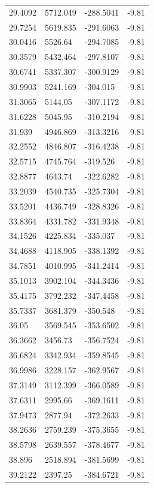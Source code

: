 \begin{table}[H]
\begin{tabular}{llll}
29.4092 & 5712.049 & -288.5041 & -9.81 \\
29.7254 & 5619.835 & -291.6063 & -9.81 \\
30.0416 & 5526.64 & -294.7085 & -9.81 \\
30.3579 & 5432.464 & -297.8107 & -9.81 \\
30.6741 & 5337.307 & -300.9129 & -9.81 \\
30.9903 & 5241.169 & -304.015 & -9.81 \\
31.3065 & 5144.05 & -307.1172 & -9.81 \\
31.6228 & 5045.95 & -310.2194 & -9.81 \\
31.939 & 4946.869 & -313.3216 & -9.81 \\
32.2552 & 4846.807 & -316.4238 & -9.81 \\
32.5715 & 4745.764 & -319.526 & -9.81 \\
32.8877 & 4643.74 & -322.6282 & -9.81 \\
33.2039 & 4540.735 & -325.7304 & -9.81 \\
33.5201 & 4436.749 & -328.8326 & -9.81 \\
33.8364 & 4331.782 & -331.9348 & -9.81 \\
34.1526 & 4225.834 & -335.037 & -9.81 \\
34.4688 & 4118.905 & -338.1392 & -9.81 \\
34.7851 & 4010.995 & -341.2414 & -9.81 \\
35.1013 & 3902.104 & -344.3436 & -9.81 \\
35.4175 & 3792.232 & -347.4458 & -9.81 \\
35.7337 & 3681.379 & -350.548 & -9.81 \\
36.05 & 3569.545 & -353.6502 & -9.81 \\
36.3662 & 3456.73 & -356.7524 & -9.81 \\
36.6824 & 3342.934 & -359.8545 & -9.81 \\
36.9986 & 3228.157 & -362.9567 & -9.81 \\
37.3149 & 3112.399 & -366.0589 & -9.81 \\
37.6311 & 2995.66 & -369.1611 & -9.81 \\
37.9473 & 2877.94 & -372.2633 & -9.81 \\
38.2636 & 2759.239 & -375.3655 & -9.81 \\
38.5798 & 2639.557 & -378.4677 & -9.81 \\
38.896 & 2518.894 & -381.5699 & -9.81 \\
39.2122 & 2397.25 & -384.6721 & -9.81 \\

\end{tabular}
\end{table}
